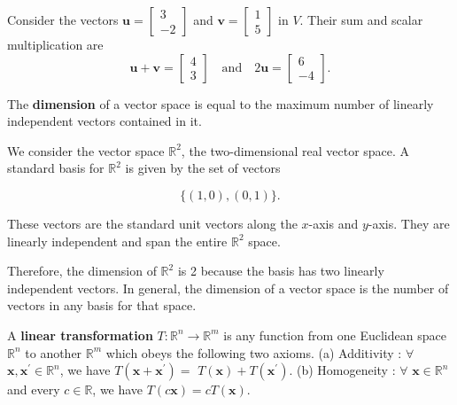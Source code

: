 \begin{example}
Consider the vectors $\mathbf{u} = \begin{bmatrix} 3 \\ -2 \end{bmatrix}$ and $\mathbf{v} = \begin{bmatrix} 1 \\ 5 \end{bmatrix}$ in $V$. Their sum and scalar multiplication are
\[
\mathbf{u} + \mathbf{v} = \begin{bmatrix} 4 \\ 3 \end{bmatrix} \quad \text{and} \quad 2 \mathbf{u} = \begin{bmatrix} 6 \\ -4 \end{bmatrix}.
\]
\end{example}
\begin{definition}
The\textbf{ dimension} of a vector space is equal to the maximum number of linearly independent vectors contained in it.
\end{definition}
\begin{example}
    We consider the vector space \( \mathbb{R}^2 \), the two-dimensional real vector space. A standard basis for \( \mathbb{R}^2 \) is given by the set of vectors

\[ \{(1, 0), (0, 1)\}. \]

These vectors are the standard unit vectors along the $x$-axis and $y$-axis. They are linearly independent and span the entire \( \mathbb{R}^2 \) space.

Therefore, the dimension of \( \mathbb{R}^2 \) is 2 because the basis has two linearly independent vectors. In general, the dimension of a vector space is the number of vectors in any basis for that space.
\end{example}



\begin{definition}
 A \textbf{linear transformation} $T: \mathbb{R}^n \rightarrow \mathbb{R}^m$ is any function from one Euclidean space $\mathbb{R}^n$ to another $\mathbb{R}^m$ which obeys the following two axioms.
 \newline
 (a) Additivity : $\forall$ $\mathbf{x}, \mathbf{x}^{\prime} \in \mathbb{R}^n$, we have $T\left(\mathbf{x}+\mathbf{x}^{\prime}\right)=$ $T\left(\mathbf{x}\right)+T\left(\mathbf{x}^{\prime}\right)$.
\newline
(b) Homogeneity : $\forall$ $\mathbf{x} \in \mathbb{\!R}^n$ and every $c \in \mathbb{R}$, we have $T(c \mathbf{x})=c T(\mathbf{x})$.
\newline
\end{definition}

